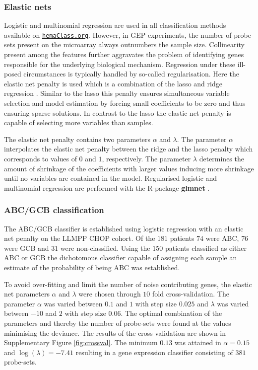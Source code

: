 \documentclass{article}
\newcommand{\hemaClass}{\href{http://hemaClass.org}{\texttt{hemaClass.org}}}
\newcommand{\R}{\textsf{R}}
\newcommand{\pkg}[1]{\textbf{#1}}
\begin{document}
\subsubsection{Elastic nets}
Logistic and multinomial regression are used in all classification methods available on \hemaClass{}.
However, in GEP experiments, the number of probe-sets present on the microarray always outnumbers the sample size.
Collinearity present among the features further aggravates the problem of identifying genes responsible for the underlying biological mechanism.
Regression under these ill-posed circumstances is typically handled by so-called regularisation.
Here the elastic net penalty \citep{Friedman2010, Zou2005} is used which is a combination of the lasso \citep{Tibshirani1996} and ridge regression \citep{Hoerl1970}.
Similar to the lasso this penalty ensures simultaneous variable selection and model estimation by forcing small coefficients to be zero and thus ensuring sparse solutions.
In contrast to the lasso the elastic net penalty is capable of selecting more variables than samples.

The elastic net penalty contains two parameters $\alpha$ and $\lambda$.
The parameter $\alpha$ interpolates the elastic net penalty between the ridge and the lasso penalty which corresponds to values of $0$ and $1$, respectively.
The parameter $\lambda$ determines the amount of shrinkage of the coefficients with larger values inducing more shrinkage until no variables are contained in the model.
Regularised logistic and multinomial regression are performed with the \R{}-package \pkg{glmnet} \citep{Friedman2010}.

\subsubsection{ABC/GCB classification}
The ABC/GCB classifier is established using logistic regression with an elastic net penalty on the LLMPP CHOP cohort.
Of the $181$ patients $74$ were ABC, $76$ were GCB and $31$ were non-classified.
Using the $150$ patients classified as either ABC or GCB the dichotomous classifier capable of assigning each sample an estimate of the probability of being ABC was established.

To avoid over-fitting and limit the number of noise contributing genes, the elastic net parameters $\alpha$ and $\lambda$ were chosen through $10$ fold cross-validation.
The parameter $\alpha$ was varied between $0.1$ and $1$ with step size $0.025$ and $\lambda$ was varied between $-10$ and $2$ with step size $0.06$.
The optimal combination of the parameters and thereby the number of probe-sets were found at the values minimising the deviance.
The results of the cross validation are shown in Supplementary Figure \ref{fig:crossval}.
The minimum $0.13$ was attained in $\alpha = 0.15$ and $\log(\lambda) = -7.41$ resulting in a gene expression classifier consisting of $381$ probe-sets.
\end{document}
